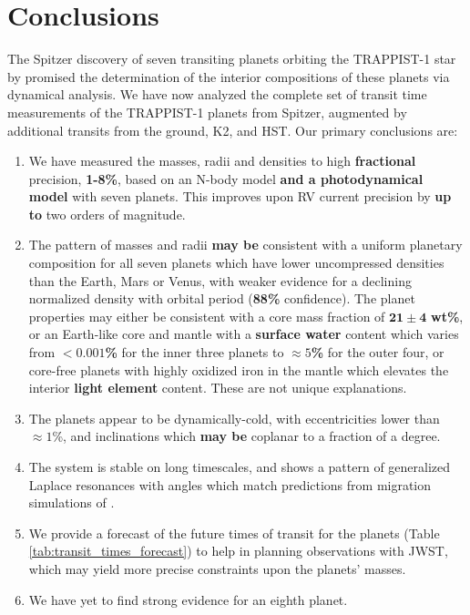 \documentclass[twocolumn]{aastex63}
\begin{document}
\section{Conclusions} \label{sec:conclusions}

The Spitzer discovery of seven transiting planets orbiting the TRAPPIST-1 star by \citet{Gillon2017} promised the determination of the interior compositions of these planets via dynamical analysis.
We have now analyzed the complete set of transit time measurements
of the TRAPPIST-1 planets from  Spitzer, augmented by
additional transits from the ground, K2, and HST.  Our primary conclusions
are:

\begin{enumerate}
    \item  We have measured the masses, radii and densities to high \textbf{fractional} precision, \textbf{1-8\%}, based on an N-body model \textbf{and a photodynamical model} with seven planets.  This improves upon RV current precision by \textbf{up to} two orders of magnitude.
    \item  The pattern of masses and radii \textbf{may be} consistent with a uniform planetary composition for all seven planets
          which have lower uncompressed densities than the Earth, Mars or Venus, with weaker evidence for a declining normalized density with orbital period (\textbf{88\%} confidence). The planet properties may either be consistent with
          a core mass fraction of $\mathbf{21{\pm}4}$ \textbf{wt\%}, or an Earth-like core and mantle with a \textbf{surface water}
          content which varies from \textbf{${<}0.001$\%} for the inner three planets to \textbf{${\approx} 5$\%}
          for the outer four, or core-free planets with highly oxidized iron in the mantle which elevates the interior \textbf{light element} content.  These are not unique explanations.
    \item  The planets appear to be dynamically-cold, with eccentricities lower than
          ${\approx }1$\%, and inclinations which \textbf{may be} coplanar to a fraction of a degree.
    \item The system is stable on long timescales, and shows a pattern of generalized Laplace resonances with angles which match predictions from migration simulations of \citet{Mah2018}.
    \item We provide a forecast of the future times of transit for the planets (Table \ref{tab:transit_times_forecast}) to help in planning observations with JWST, which may yield more precise constraints upon the planets' masses.
    \item We have yet to find strong evidence for an eighth planet.
\end{enumerate}
\end{document}

